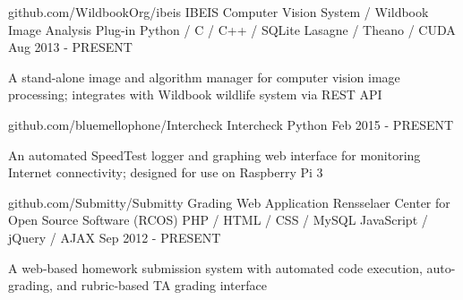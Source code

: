 

\begin{cventries}


  \cventry
    {github.com/WildbookOrg/ibeis} %
    {IBEIS Computer Vision System / Wildbook Image Analysis Plug-in} %
    {Python / C / C++ / SQLite \newline Lasagne / Theano / CUDA} %
    {Aug 2013 - PRESENT} %
    {
      \begin{cvitems} %
        \item {A stand-alone image and algorithm manager for computer vision image processing; integrates with Wildbook wildlife system via REST API}
      \end{cvitems}
    }

  \cventry
    {github.com/bluemellophone/Intercheck} %
    {Intercheck} %
    {Python} %
    {Feb 2015 - PRESENT} %
    {
      \begin{cvitems} %
        \item {An automated SpeedTest logger and graphing web interface for monitoring Internet connectivity; designed for use on Raspberry Pi 3}
      \end{cvitems}
    }

  \cventry
    {github.com/Submitty/Submitty} %
    {Grading Web Application \dotSep Rensselaer Center for Open Source Software (RCOS)} %
    {PHP / HTML / CSS / MySQL \newline JavaScript / jQuery / AJAX } %
    {Sep 2012 - PRESENT} %
    {
      \begin{cvitems} %
        \item {A web-based homework submission system with automated code execution, auto-grading, and rubric-based TA grading interface}
      \end{cvitems}
    }


\end{cventries}
